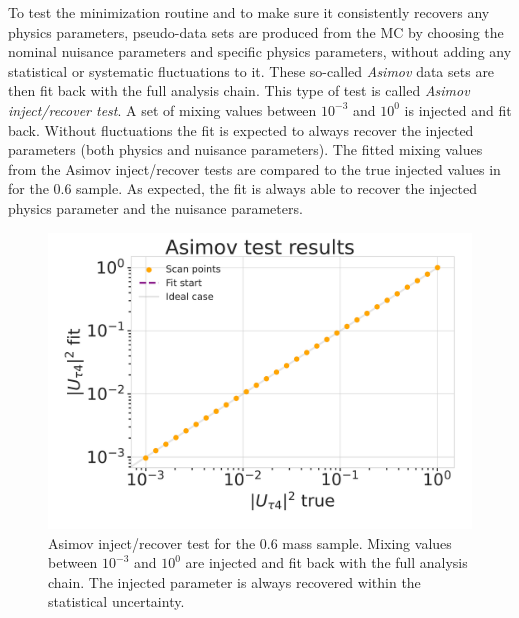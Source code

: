 To test the minimization routine and to make sure it consistently recovers any physics parameters, pseudo-data sets are produced from the MC by choosing the nominal nuisance parameters and specific physics parameters, without adding any statistical or systematic fluctuations to it. These so-called \textit{Asimov} data sets are then fit back with the full analysis chain. This type of test is called \textit{Asimov inject/recover test}. A set of mixing values between $10^{-3}$ and $10^{0}$ is injected and fit back.
Without fluctuations the fit is expected to always recover the injected parameters (both physics and nuisance parameters). The fitted mixing values from the Asimov inject/recover tests are compared to the true injected values in  for the \SI{0.6}{\gev} sample. As expected, the fit is always able to recover the injected physics parameter and the nuisance parameters.



\begin{figure}[h]
    \includegraphics{figures/results/checks/asimov_scan_0.6_GeV-01.png}
	\caption[Asimov inject/recover test (\SI{0.6}{\gev})]{Asimov inject/recover test for the \SI{0.6}{\gev} mass sample. Mixing values between $10^{-3}$ and $10^{0}$ are injected and fit back with the full analysis chain. The injected parameter is always recovered within the statistical uncertainty.}
\end{figure}


